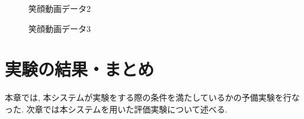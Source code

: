 \begin{figure}[htbp]
  \setlength\intextsep{0pt}
    \begin{center}
    \end{center}
    \caption{笑顔動画データ2}
    \label{fig:preex2}
\end{figure}
\begin{figure}[htbp]
  \setlength\intextsep{0pt}
    \begin{center}
    \end{center}
    \caption{笑顔動画データ3}
    \label{fig:preex3}
\end{figure}

\section{実験の結果・まとめ}
本章では, 本システムが実験をする際の条件を満たしているかの予備実験を行なった.
次章では本システムを用いた評価実験について述べる.
